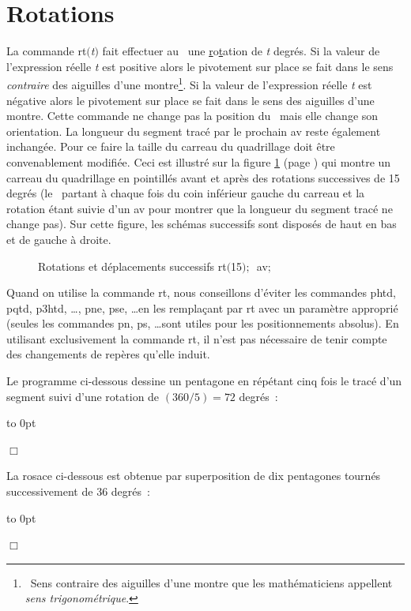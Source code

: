 \section{Rotations}
La commande {\idt rt$(${\em t}$)$} fait effectuer au \robot\ une \underline{r}o\underline{t}ation de {\em t} degrés. 
Si la valeur de l'expression réelle {\em t} est positive alors le pivotement sur place se fait dans le sens 
{\em contraire} des aiguilles d'une montre\footnote{\ Sens contraire des aiguilles d'une montre que les mathématiciens
appellent {\em sens trigonométrique}.}. Si la valeur de l'expression réelle {\em t} est négative alors le pivotement sur 
place se fait dans le sens des ai\-guil\-les d'une montre. Cette commande ne change pas la position du \robot\ mais elle change
son orientation. La longueur du segment tracé par le prochain {\idt av} reste également inchangée. Pour ce faire la taille du 
carreau du quadrillage doit être convenablement modifiée. Ceci est illustré sur la figure \ref{fig:rtexp} 
(page \pageref{fig:rtexp}) qui montre  un carreau du quadrillage en pointillés avant et après des rotations successives de
15 degrés (le \robot\ partant à chaque fois du coin inférieur gauche du carreau et la rotation étant suivie d'un {\idt av} pour montrer 
que la longueur du segment tracé ne change pas). Sur cette figure, les 
schémas successifs sont disposés de haut en bas et de gauche à droite.
\begin{figure}[htbp]
 \caption{Rotations et déplacements successifs {\idt rt$($15$);$\ av$;$}}\label{fig:rtexp}
\end{figure}

Quand on utilise la commande {\idt rt}, nous conseillons d'éviter les commandes {\idt phtd}, 
{\idt pqtd},  {\idt p3htd}, \ldots, {\idt pne}, {\idt pse}, \ldots en les remplaçant par {\idt rt} avec un paramètre
approprié (seules les commandes {\idt pn}, {\idt ps}, \ldots sont utiles pour les positionnements absolus). 
En utilisant exclusivement la commande {\idt  rt}, il n'est pas nécessaire de tenir 
compte des changements de repères  qu'elle induit. 
\begin{exemple}[Pentagone]{\rm
Le programme ci-dessous dessine un pentagone en répétant cinq fois le tracé d'un segment suivi
d'une rotation de $(360 / 5) = 72$ degrés~:

 {\raggedright 
 \vbox to 0pt{}%
 
 }
\noindent $\Box$ }\end{exemple}
\begin{exemple}{\rm
La rosace ci-dessous est obtenue par superposition de dix pentagones tournés successivement de 36 degrés~:

 {\raggedright 
 \vbox to 0pt{}%
 
 }
\noindent $\Box$ }\end{exemple}

